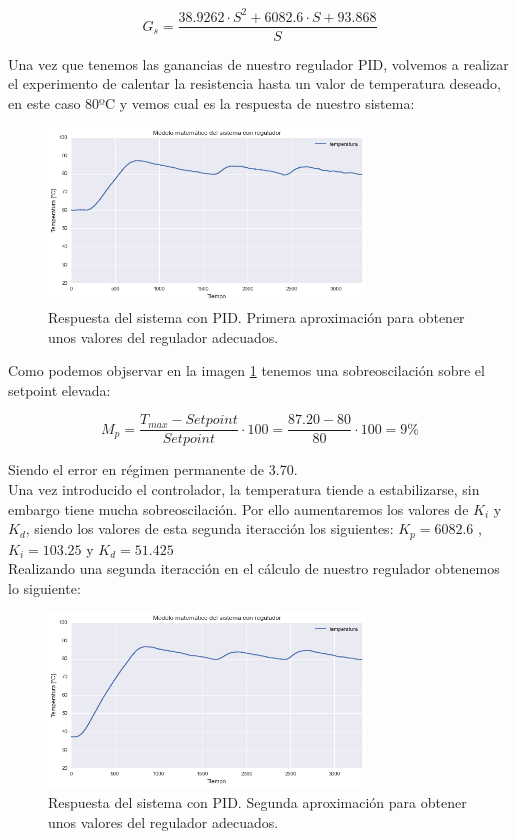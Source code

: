 $$G_s = \frac{38.9262 \cdot S^2 + 6082.6 \cdot S + 93.868}{S}$$

Una vez que tenemos las ganancias de nuestro regulador PID, volvemos a realizar el experimento de calentar la resistencia hasta un valor de temperatura deseado, en este caso 80ºC y vemos cual es la respuesta de nuestro sistema:

\begin{figure}[H]
    \centering
    \includegraphics[width=0.75\textwidth]{images/PLC/modelado/modelado_26_1.png}
    \caption[Respuesta del sistema con PID iteracción 1.]{Respuesta del sistema con PID. Primera aproximación para obtener unos valores del regulador adecuados.}
    \label{fig:plc_PID1}
\end{figure}

Como podemos objservar en la imagen \ref{fig:plc_PID1} tenemos una sobreoscilación sobre el setpoint elevada:

$$M_{p}=\frac{T_{max}-Setpoint}{Setpoint} \cdot 100 = \frac{87.20-80}{80} \cdot 100 = 9\%$$ 

Siendo el error en régimen  permanente de 3.70.\\

Una vez introducido el controlador, la temperatura tiende a estabilizarse, sin embargo tiene mucha sobreoscilación. Por ello aumentaremos los valores de $K_i$ y $K_d$, siendo los valores de esta segunda iteracción los siguientes:
$K_p = 6082.6$ ,$K_i=103.25$ y $K_d=51.425$\\

Realizando una segunda iteracción en el cálculo de nuestro regulador obtenemos lo siguiente:

\begin{figure}[H]
    \centering
    \includegraphics[width=0.75\textwidth]{images/PLC/modelado/modelado_30_1.png}
    \caption[Respuesta del sistema con PID. Iteracción 2]{Respuesta del sistema con PID. Segunda aproximación para obtener unos valores del regulador adecuados.}
    \label{fig:plc_PID2}
\end{figure}

